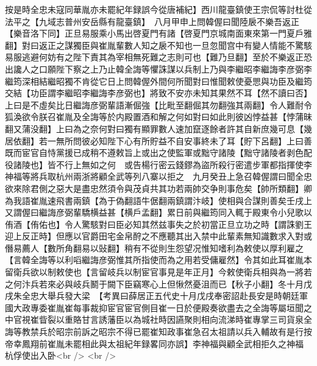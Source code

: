 按是時全忠未寇同華胤亦未罷紀年録誤今從唐補紀】西川龍臺鎮使王宗侃等討杜從法平之【九域志普州安岳縣有龍臺鎮】　八月甲申上問韓偓曰聞陸扆不樂吾返正【樂音洛下同】正旦易服乘小馬出啓夏門有諸【啓夏門京城南面東來第一門夏戶雅翻】對曰返正之謀獨臣與崔胤輩數人知之扆不知也一旦忽聞宫中有變人情能不驚駭易服逃避何妨有之陛下責其為宰相無死難之志則可也【難乃旦翻】至於不樂返正恐出讒人之口願陛下察之上乃止韓全誨等懼誅謀以兵制上乃與李繼昭李繼誨李彦弼李繼筠深相結繼昭獨不肯從它日上問韓偓外間何所聞對曰惟聞敕使憂愳與功臣及繼筠交結【功臣謂李繼昭李繼誨李彦弼也】將致不安亦未知其果然不耳【然不讀曰否】上曰是不虛矣比日繼誨彦弼輩語漸倔強【比毗至翻倔其勿翻強其兩翻】令人難耐令狐渙欲令朕召崔胤及全誨等於内殿置酒和解之何如對曰如此則彼凶悖益甚【悖蒲昧翻又蒲没翻】上曰為之奈何對曰獨有顯罪數人速加竄逐餘者許其自新庶幾可息【幾居依翻】若一無所問彼必知陛下心有所貯益不自安事終未了耳【貯下呂翻】上曰善既而宦官自恃黨援已成稍不遵敕旨上或出之使監軍或黜守諸陵【黜守諸陵者剥色配役諸陵也】皆不行上無如之何　或告楊行密云錢鏐為盜所殺行密遣步軍都指揮使李神福等將兵取杭州兩浙將顧全武等列八寨以拒之　九月癸丑上急召韓偓謂曰聞全忠欲來除君側之惡大是盡忠然須令與茂貞共其功若兩帥交争則事危矣【帥所類翻】卿為我語崔胤速飛書兩鎮【為于偽翻語牛倨翻兩鎮謂汴岐】使相與合謀則善矣壬戌上又謂偓曰繼誨彦弼輩驕横益甚【横戶孟翻】累日前與繼筠同入輒于殿東令小兒歌以侑酒【侑佑也】令人驚駭對曰臣必知其然兹事失之於初當正旦立功之時【謂誅劉王迎上反正時】但應以官爵田宅金帛酧之不應聽其出入禁中此輩素無知識數求入對或僭易薦人【數所角翻易以䜴翻】稍有不從則生怨望况惟知嗜利為敕使以厚利雇之【言韓全誨等以利㗖繼誨彦弼惟其所指使而為之用若受傭雇然】令其如此耳崔胤本留衛兵欲以制敕使也【言留岐兵以制宦官事見是年正月】今敕使衛兵相與為一將若之何汴兵若來必與岐兵鬭于闕下臣竊寒心上但愀然憂沮而已【秋子小翻】冬十月戊戌朱全忠大舉兵發大梁　【考異曰薛居正五代史十月戊戌奉密詔赴長安是時朝廷軍國大政專委崔胤崔每事裁抑宦官宦官側目崔一日於便殿奏欲盡去之全誨等屬垣聞之中官視崔眥裂以重賂甘言誘藩臣以為城社時因讌聚則相向流涕時崔專掌三司貨泉全誨等教禁兵於昭宗前訴之昭宗不得已罷崔知政事崔急召太祖請以兵入輔故有是行按帝幸鳳翔前崔胤未罷相此與太祖紀年録畧同亦誤】李神福與顧全武相拒久之神福杭俘使出入卧<br />
<br />
